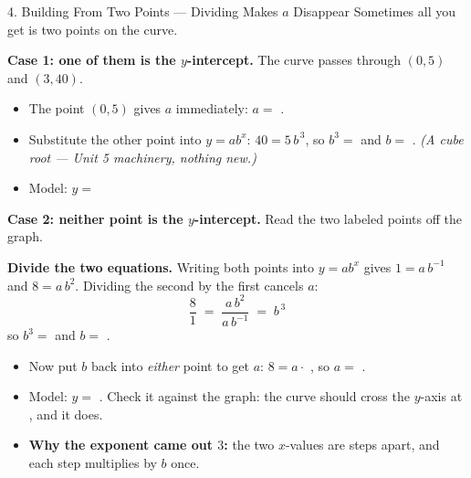 \documentclass[10pt]{article}
\newcommand{\lgrid}[4]{%
  \draw[step=1, linegray!40, very thin] (#1,#3) grid (#2,#4);
  \draw[->, semithick, charcoal] (#1,0)--(#2,0) node[below right, font=\scriptsize]{$x$};
  \draw[->, semithick, charcoal] (0,#3)--(0,#4) node[left, font=\scriptsize]{$y$};}
\newcommand{\expcurve}[4]{\draw[very thick, forest, domain=#3:#4, samples=120, smooth]
  plot (\x,{#1*exp((#2)*(\x))});}
\begin{document}
\begin{notesbox}{4. Building From Two Points --- Dividing Makes $a$ Disappear}
Sometimes all you get is two points on the curve.

\vspace{3pt}
\textbf{Case 1: one of them is the $y$-intercept.} The curve passes through $(0,5)$ and $(3,40)$.
\begin{itemize}[leftmargin=1.5em, itemsep=3pt]
  \item The point $(0,5)$ gives $a$ immediately: $a=$ \blank{1.2cm}.
  \item Substitute the other point into $y=ab^{x}$: \; $40 = 5\,b^{\,3}$, so $b^{3}=$
        \blank{1.2cm} and $b=$ \blank{1.2cm}. \;
        \emph{(A cube root --- Unit 5 machinery, nothing new.)}
  \item Model: $y=$ \blank{2.8cm}
\end{itemize}

\vspace{4pt}
\textbf{Case 2: neither point is the $y$-intercept.} Read the two labeled points off the graph.
\begin{center}
\begin{minipage}[c]{0.46\linewidth}
\centering
{}
\end{minipage}
\begin{minipage}[c]{0.50\linewidth}
\small
\textbf{Divide the two equations.} Writing both points into $y=ab^{x}$ gives
$1=a\,b^{-1}$ and $8=a\,b^{2}$. Dividing the second by the first cancels $a$:
\[
  \frac{8}{1} \;=\; \frac{a\,b^{2}}{a\,b^{-1}} \;=\; b^{\,3}
\]
so $b^{3}=$ \blank{1.0cm} and $b=$ \blank{1.0cm}.
\end{minipage}
\end{center}
\begin{itemize}[leftmargin=1.5em, itemsep=3pt]
  \item Now put $b$ back into \emph{either} point to get $a$: \; $8=a\cdot$ \blank{1.0cm}, so
        $a=$ \blank{1.0cm}.
  \item Model: $y=$ \blank{2.6cm}. \; Check it against the graph: the curve should cross the
        $y$-axis at \blank{1.6cm}, and it does.
  \item \textbf{Why the exponent came out $3$:} the two $x$-values are \blank{1.4cm} steps apart,
        and each step multiplies by $b$ once.
\end{itemize}
\end{notesbox}
\end{document}
